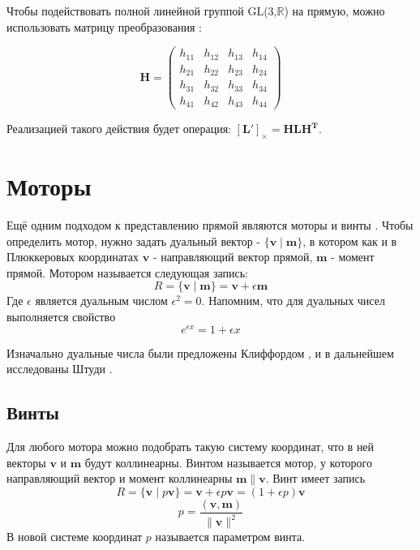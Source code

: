   Чтобы подействовать полной линейной группой  GL(3,$\mathbb{R}$) на прямую, можно использовать матрицу преобразования 
  \autocite[Гл. 3.2, секция II. Plücker matrices, пункт 5]{hartley2003multiple}: 

  \begin{equation*}
    \mathbf{H} =
    \begin{pmatrix}
      h_{11} & h_{12} & h_{13} & h_{14} \\
      h_{21} & h_{22} & h_{23} & h_{24} \\
      h_{31} & h_{32} & h_{33} & h_{34} \\
      h_{41} & h_{42} & h_{43} & h_{44} 
  \end{pmatrix}
  \end{equation*}

  Реализацией такого действия будет операция: $[\mathbf{L'}]_\times = \mathbf{HLH^T}$.

  \section{Моторы}

  Ещё одним подходом к представлению прямой являются моторы и винты \autocite{dimentberg1965винтовое}. Чтобы определить мотор, нужно задать дуальный вектор
  - $\{\mathbf{v} \mid \mathbf{m}\}$, в котором как и в Плюккеровых координатах $\mathbf{v}$ - направляющий вектор прямой, $\mathbf{m}$ - момент прямой.
  Мотором называется следующая запись: 
  \begin{equation*}
    R = \{ \mathbf{v} \mid \mathbf{m} \} = \mathbf{v} + \epsilon \mathbf{m}
  \end{equation*}
  Где $\epsilon$ является дуальным числом $\epsilon^2=0$. Напомним, что для дуальных чисел выполняется свойство
  \begin{equation*}
    e^{\epsilon x} = 1 + \epsilon x
  \end{equation*}

  Изначально дуальные числа были предложены Клиффордом \autocite{cliffordPreliminarySketchBiquaternions1871},
  и в дальнейшем исследованы Штуди \autocite{zindlerGeometrieDynamenStudy1903}.

  \subsection{Винты}

  Для любого мотора можно подобрать такую систему координат, что в ней векторы $\mathbf{v}$ и $\mathbf{m}$ будут коллинеарны. 
  Винтом называется мотор, у которого направляющий вектор и момент коллинеарны $\mathbf{m} \| \mathbf{v}$. Винт имеет запись
  \begin{equation*}
    R = \{ \mathbf{v} \mid p\mathbf{v} \} = \mathbf{v} + \epsilon p \mathbf{v} = (1+\epsilon p)\mathbf{v}
  \end{equation*}
  \begin{equation*}
    p=\frac{(\mathbf{v}, \mathbf{m})}{\| \mathbf{v} \|^2}
  \end{equation*}
  В новой системе координат $p$ называется параметром винта.

